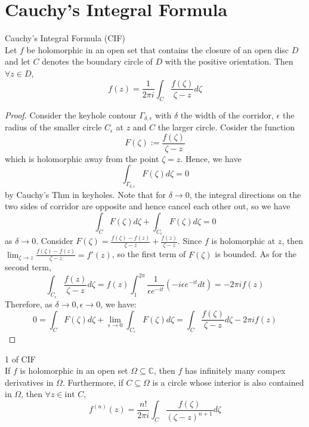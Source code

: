 \section{Cauchy's Integral Formula}

\begin{theorem}{Cauchy's Integral Formula (CIF)}\\
Let $f$ be holomorphic in an open set that contains the closure of an open disc $D$ and let $C$ denotes the boundary circle of $D$ with the positive orientation. Then $\forall z\in D$,
\[
f(z)= \frac{1}{2\pi i} \int_C \frac{f(\zeta)}{\zeta- z} d\zeta
\]
\end{theorem}

\begin{proof}
    Consider the keyhole contour $\Gamma_{\delta,\epsilon}$ with $\delta$ the width of the corridor, $\epsilon$ the radius of the smaller circle $C_\epsilon$ at $z$ and $C$ the larger circle. Cosider the function
    \[
    F(\zeta):= \frac{f(\zeta)}{\zeta-z}
    \]
    which is holomorphic away from the point $\zeta=z$. Hence, we have
    \[
    \int_{\Gamma_{\delta,\epsilon}} F(\zeta) d\zeta=0
    \]
    by Cauchy's Thm in keyholes. Note that for $\delta\to 0$, the integral directions on the two sides of corridor are opposite and hence cancel each other out, so we have
    \[
    \int_CF(\zeta)d\zeta+ \int_{C_\epsilon} F(\zeta) d\zeta=0
    \]
    as $\delta\to 0$. Consider $F(\zeta)= \frac{f(\zeta)- f(z)}{\zeta- z}+ \frac{f(z)}{\zeta -z}$. Since $f$ is holomorphic at $z$, then $\lim_{\zeta \to z} \frac{f(\zeta)- f(z)}{\zeta -z}=f'(z)$, so the first term of $F(\zeta)$ is bounded. As for the second term,
    \[
    \int_{C_\epsilon} \frac{f(z)}{\zeta-z} d\zeta= f(z) \int_1^{2\pi} \frac{1}{\epsilon e^{-it}} (-i\epsilon e^{-it}dt)= -2\pi if(z)
    \]
    Therefore, as $\delta \to 0, \epsilon\to 0$, we have:
    \[
    0=\int_CF(\zeta) d\zeta+\lim_{\epsilon\to 0} \int_{C_\epsilon} F(\zeta) d\zeta= \int_C \frac{f(\zeta)}{\zeta-z}d\zeta- 2\pi if(z)
    \]
\end{proof}

\begin{corollary}{1 of CIF}\\
If $f$ is holomorphic in an open set $\Omega \subseteq \mathbb{C}$, then $f$ has infinitely many compex derivatives in $\Omega$. Furthermore, if $C\subseteq \Omega$ is a circle whose interior is also contained in $\Omega$, then $\forall z\in \text{int }C$,
\[
f^{(n)} (z)= \frac{n!}{2\pi i} \int_C\frac{f(\zeta)}{(\zeta- z)^{n+1}} d\zeta
\]
\end{corollary}

